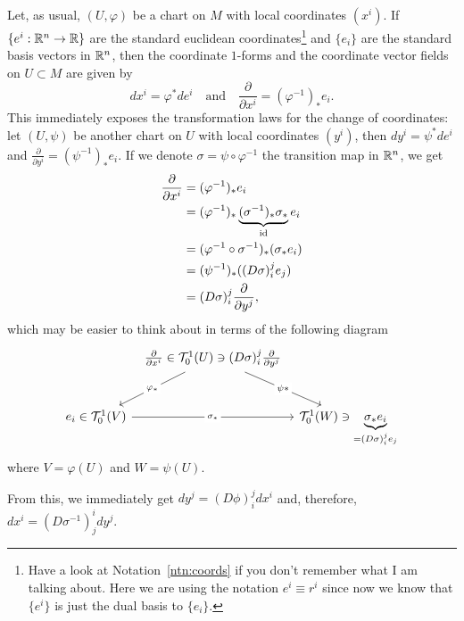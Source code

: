 \begin{example}
  Let, as usual, $(U,\varphi)$ be a chart on $M$ with local coordinates $(x^i)$.
  If $\{e^i:\mathbb{R}^n\to\mathbb{R}\}$ are the standard euclidean coordinates\footnote{Have a look at Notation~\ref{ntn:coords} if you don't remember what I am talking about.
    Here we are using the notation $e^i \equiv r^i$ since now we know that $\{e^i\}$ is just the dual basis to $\{e_i\}$. } and $\{e_i\}$ are the standard basis vectors in $\mathbb{R}^n$, then the coordinate $1$-forms and the coordinate vector fields on $U\subset M$ are given by
  \begin{equation}
    dx^i = \varphi^* de^i
    \quad\mbox{and}\quad
    \frac{\partial}{\partial x^i} = (\varphi^{-1})_* e_i.
  \end{equation}
  This immediately exposes the transformation laws for the change of coordinates: let $(U, \psi)$ be another chart on $U$ with local coordinates $(y^i)$, then $dy^i = \psi^* de^i$ and $\frac{\partial}{\partial y^i} = (\psi^{-1})_* e_i$. If we denote $\sigma = \psi\circ\varphi^{-1}$ the transition map in $\mathbb{R}^n$, we get
  \begin{align}
    \frac{\partial}{\partial x^i} & = (\varphi^{-1})_* e_i                                             \\
                                  & = (\varphi^{-1})_* \LaTeXunderbrace{(\sigma^{-1})_*\sigma_*}_{\id} e_i \\
                                  & = (\varphi^{-1}\circ \sigma^{-1})_* (\sigma_* e_i)                     \\
                                  & = (\psi^{-1})_* ((D\sigma)_i^j e_j)                                  \\
                                  & = (D\sigma)_i^j \frac{\partial}{\partial y^j},
  \end{align}
  which may be easier to think about in terms of the following diagram
  \begin{equation}\nonumber
    \begin{tikzcd}[row sep=large, column sep=tiny]
      & \frac{\partial}{\partial x^i} \in \cT_0^1(U) \ni (D\sigma)_i^j \frac{\partial}{\partial y^j} \arrow[dl, "\varphi_*" description] \arrow[dr, "\psi*" description] & \\
      e_i \in \cT_0^1(V) \arrow[rr, "\sigma_*" description] & & \cT_0^1(W) \ni \LaTeXunderbrace{\sigma_* e_i}_{= (D\sigma)_i^j e_j}
    \end{tikzcd}
  \end{equation}
  where $V = \varphi(U)$ and $W = \psi(U)$.

  From this, we immediately get $dy^j = (D\phi)_i^j dx^i$ and, therefore, $dx^i =  (D\sigma^{-1})_j^i dy^j$.
\end{example}

